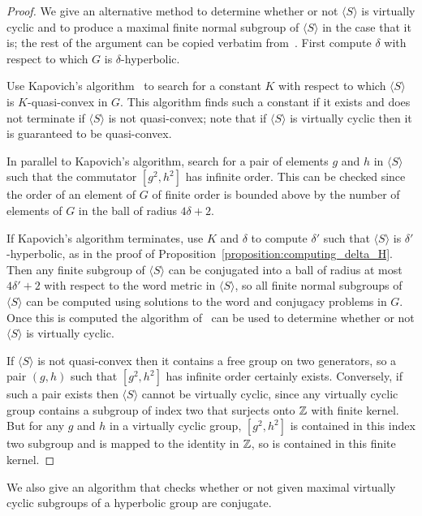 \begin{proof} 
We give an alternative method to determine whether or not $\langle S\rangle$ is virtually cyclic and to produce a maximal finite normal subgroup of $\langle S\rangle$ in the case that it is; the rest of the argument can be copied verbatim from~\cite{dahmaniguirardel11}. 
First compute $\delta$ with respect to which $G$ is $\delta$-hyperbolic.

Use Kapovich's algorithm~\cite[Proposition 4]{kapovich96} to search for a constant $K$ with respect to which $\langle S\rangle$ is $K$-quasi-convex in $G$.
This algorithm finds such a constant if it exists and does not terminate if $\langle S\rangle$ is not quasi-convex; note that if $\langle S\rangle$ is virtually cyclic then it is guaranteed to be quasi-convex. 

In parallel to Kapovich's algorithm, search for a pair of elements $g$ and $h$ in $\langle S\rangle$ such that the commutator $[g^2, h^2]$ has infinite order. 
This can be checked since the order of an element of $G$ of finite order is bounded above by the number of elements of $G$ in the ball of radius $4\delta + 2$.

If Kapovich's algorithm terminates, use $K$ and $\delta$ to compute $\delta'$ such that $\langle S\rangle$ is $\delta'$-hyperbolic, as in the proof of Proposition~\ref{proposition:computing_delta_H}. 
Then any finite subgroup of $\langle S\rangle$ can be conjugated into a ball of radius at most $4\delta' + 2$ with respect to the word metric in $\langle S\rangle$, so all finite normal subgroups of $\langle S\rangle$ can be computed using solutions to the word and conjugacy problems in $G$. 
Once this is computed the algorithm of~\cite[Lemma 2.8]{dahmaniguirardel11} can be used to determine whether or not $\langle S\rangle$ is virtually cyclic.

If $\langle S\rangle$ is not quasi-convex then it contains a free group on two generators, so a pair $(g, h)$ such that $[g^2,h^2]$ has infinite order certainly exists.
Conversely, if such a pair exists then $\langle S\rangle$ cannot be virtually cyclic, since any virtually cyclic group contains a subgroup of index two that surjects onto $\mathbb{Z}$ with finite kernel.
But for any $g$ and $h$ in a virtually cyclic group, $[g^2,h^2]$ is contained in this index two subgroup and is mapped to the identity in $\mathbb{Z}$, so is contained in this finite kernel.
\end{proof}

We also give an algorithm that checks whether or not given maximal virtually cyclic subgroups of a hyperbolic group are conjugate.


